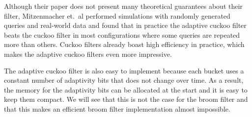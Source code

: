 \documentclass[../paper.tex]{subfiles}
\begin{document}
Although their paper does not present many theoretical guarantees about their filter, Mitzenmacher et.\ al performed simulations with randomly generated queries and real-world data and found that in practice the adaptive cuckoo filter beats the cuckoo filter in most configurations where some queries are repeated more than others. Cuckoo filters already boast high efficiency in practice, which makes the adaptive cuckoo filters even more impressive.

The adaptive cuckoo filter is also easy to implement because each bucket uses a constant number of adaptivity bits that does not change over time.
As a result, the memory for the adaptivity bits can be allocated at the start and it is easy to keep them compact. We will see that this is not the case
for the broom filter and that this makes an efficient broom filter implementation almost impossible.
\end{document}
